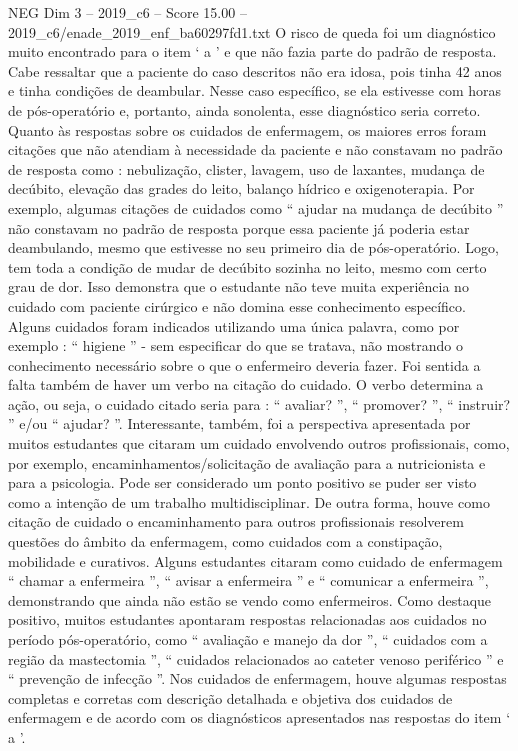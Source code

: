 \begin{textsample}{NEG Dim 3 – 2019\_c6 – Score 15.00 – 2019\_c6/enade\_2019\_enf\_ba60297fd1.txt}
O risco de queda foi um diagnóstico muito encontrado para o item ‘ a ’ e que não fazia parte do padrão de resposta.
Cabe ressaltar que a paciente do caso descritos não era idosa, pois tinha 42 anos e tinha condições de deambular.
Nesse caso específico, se ela estivesse com horas de pós-operatório e, portanto, ainda sonolenta, esse diagnóstico seria correto.
Quanto às respostas sobre os cuidados de enfermagem, os maiores erros foram citações que não atendiam à necessidade da paciente e não constavam no padrão de resposta como : nebulização, clister, lavagem, uso de laxantes, mudança de decúbito, elevação das grades do leito, balanço hídrico e oxigenoterapia.
Por exemplo, algumas citações de cuidados como “ ajudar na mudança de decúbito ” não constavam no padrão de resposta porque essa paciente já poderia estar deambulando, mesmo que estivesse no seu primeiro dia de pós-operatório.
Logo, tem toda a condição de mudar de decúbito sozinha no leito, mesmo com certo grau de dor.
Isso demonstra que o estudante não teve muita experiência no cuidado com paciente cirúrgico e não domina esse conhecimento específico.
Alguns cuidados foram indicados utilizando uma única palavra, como por exemplo : “ higiene ” - sem especificar do que se tratava, não mostrando o conhecimento necessário sobre o que o enfermeiro deveria fazer.
Foi sentida a falta também de haver um verbo na citação do cuidado.
O verbo determina a ação, ou seja, o cuidado citado seria para : “ avaliar? ”, “ promover? ”, “ instruir? ” e/ou “ ajudar? ”.
Interessante, também, foi a perspectiva apresentada por muitos estudantes que citaram um cuidado envolvendo outros profissionais, como, por exemplo, encaminhamentos/solicitação de avaliação para a nutricionista e para a psicologia.
Pode ser considerado um ponto positivo se puder ser visto como a intenção de um trabalho multidisciplinar.
De outra forma, houve como citação de cuidado o encaminhamento para outros profissionais resolverem questões do âmbito da enfermagem, como cuidados com a constipação, mobilidade e curativos.
Alguns estudantes citaram como cuidado de enfermagem “ chamar a enfermeira ”, “ avisar a enfermeira ” e “ comunicar a enfermeira ”, demonstrando que ainda não estão se vendo como enfermeiros.
Como destaque positivo, muitos estudantes apontaram respostas relacionadas aos cuidados no período pós-operatório, como “ avaliação e manejo da dor ”, “ cuidados com a região da mastectomia ”, “ cuidados relacionados ao cateter venoso periférico ” e “ prevenção de infecção ”.
Nos cuidados de enfermagem, houve algumas respostas completas e corretas com descrição detalhada e objetiva dos cuidados de enfermagem e de acordo com os diagnósticos apresentados nas respostas do item ‘ a ’.

\end{textsample}
